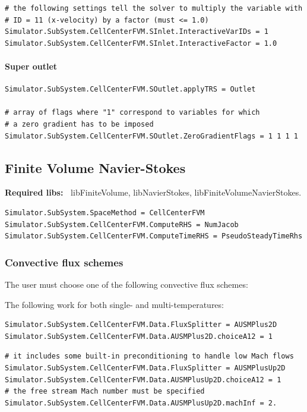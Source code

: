 \documentclass[11pt]{article}
\begin{document}
\begin{lstlisting}[breaklines]
# the following settings tell the solver to multiply the variable with 
# ID = 11 (x-velocity) by a factor (must <= 1.0)
Simulator.SubSystem.CellCenterFVM.SInlet.InteractiveVarIDs = 1
Simulator.SubSystem.CellCenterFVM.SInlet.InteractiveFactor = 1.0
\end{lstlisting}

\paragraph{Super outlet}

\begin{lstlisting}[breaklines]
Simulator.SubSystem.CellCenterFVM.SOutlet.applyTRS = Outlet

# array of flags where "1" correspond to variables for which 
# a zero gradient has to be imposed
Simulator.SubSystem.CellCenterFVM.SOutlet.ZeroGradientFlags = 1 1 1 1
\end{lstlisting}

\subsection{Finite Volume Navier-Stokes}

{\bf Required libs:~} libFiniteVolume, libNavierStokes, libFiniteVolumeNavierStokes.

\begin{lstlisting}[breaklines]
Simulator.SubSystem.SpaceMethod = CellCenterFVM
Simulator.SubSystem.CellCenterFVM.ComputeRHS = NumJacob
Simulator.SubSystem.CellCenterFVM.ComputeTimeRHS = PseudoSteadyTimeRhs
\end{lstlisting}

\subsubsection{Convective flux schemes}

The user must choose one of the following convective flux schemes:

The following work for both single- and multi-temperatures:
\begin{lstlisting}[breaklines]
Simulator.SubSystem.CellCenterFVM.Data.FluxSplitter = AUSMPlus2D
Simulator.SubSystem.CellCenterFVM.Data.AUSMPlus2D.choiceA12 = 1
\end{lstlisting}

\begin{lstlisting}[breaklines]
# it includes some built-in preconditioning to handle low Mach flows
Simulator.SubSystem.CellCenterFVM.Data.FluxSplitter = AUSMPlusUp2D
Simulator.SubSystem.CellCenterFVM.Data.AUSMPlusUp2D.choiceA12 = 1
# the free stream Mach number must be specified
Simulator.SubSystem.CellCenterFVM.Data.AUSMPlusUp2D.machInf = 2.
\end{lstlisting}
\end{document}
